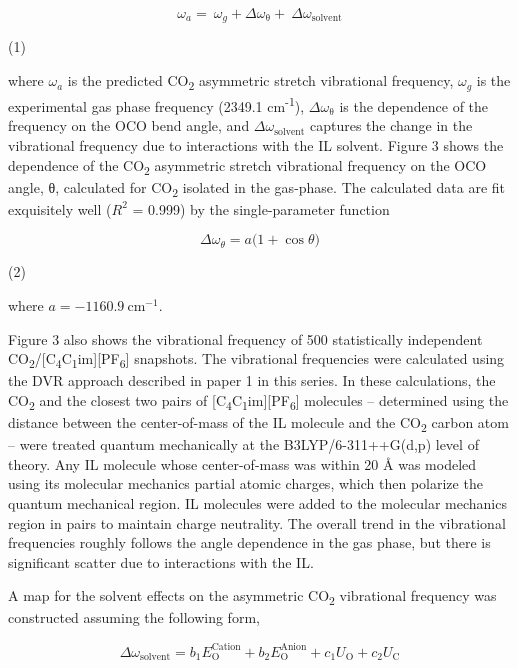 \documentclass[]{article}
\begin{document}
\[\omega_{a} = \ \omega_{g} + \Delta\omega_{\mathrm{\theta}} + \ \Delta\omega_{\mathrm{\text{solvent}}}\]

(1)

where \(\omega_{a}\) is the predicted CO\textsubscript{2} asymmetric stretch vibrational frequency, \(\omega_{g}\) is the experimental gas phase frequency (2349.1 cm\textsuperscript{-1}), \(\Delta\omega_{\mathrm{\theta}}\) is the dependence of the frequency on the OCO bend angle, and \(\Delta\omega_{\mathrm{\text{solvent}}}\) captures the change in the vibrational frequency due to interactions with the IL solvent. Figure 3 shows the dependence of the CO\textsubscript{2} asymmetric stretch vibrational frequency on the OCO angle, θ, calculated for CO\textsubscript{2} isolated in the gas-phase.  The calculated data are fit exquisitely well (\(R^{2}\) = 0.999) by the single-parameter function

\[\Delta\omega_{\theta} = a(1 + \cos{\theta)}\]

(2)

where \(a = - 1160.9\ \mathrm{c}\mathrm{m}^{\mathrm{- 1}}.\)

Figure 3 also shows the vibrational frequency of 500 statistically independent CO\textsubscript{2}/{[}C\textsubscript{4}C\textsubscript{1}im{]}{[}PF\textsubscript{6}{]} snapshots. The vibrational frequencies were calculated using the DVR approach described in paper 1 in this series. In these calculations, the CO\textsubscript{2} and the closest two pairs of {[}C­\textsubscript{4}C\textsubscript{1}im{]}{[}PF\textsubscript{6}{]} molecules -- determined using the distance between the center-of-mass of the IL molecule and the CO\textsubscript{2} carbon atom -- were treated quantum mechanically at the B3LYP/6-311++G(d,p) level of theory. Any IL molecule whose center-of-mass was within 20 Å was modeled using its molecular mechanics partial atomic charges, which then polarize the quantum mechanical region. IL molecules were added to the molecular mechanics region in pairs to maintain charge neutrality. The overall trend in the vibrational frequencies roughly follows the angle dependence in the gas phase, but there is significant scatter due to interactions with the IL.

A map for the solvent effects on the asymmetric CO\textsubscript{2} vibrational frequency was constructed assuming the following form,

\[\Delta\omega_{\mathrm{\text{solvent}}} = b_{1}E_{\mathrm{O}}^{\text{Cation}} + b_{2}E_{\mathrm{O}}^{\text{Anion}} + c_{1}U_{\mathrm{O}} + c_{2}U_{\mathrm{C}}\]
\end{document}
